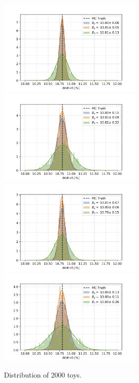 \begin{figure}[ht]
    \centering
    \includegraphics[width=7cm]{chapters/Analysis/sectionStatisticalAnalysis/figures/test_mu1b.png}
    \includegraphics[width=7cm]{chapters/Analysis/sectionStatisticalAnalysis/figures/test_mu2b.png}
    \includegraphics[width=7cm]{chapters/Analysis/sectionStatisticalAnalysis/figures/test_e1b.png}
    \includegraphics[width=7cm]{chapters/Analysis/sectionStatisticalAnalysis/figures/test_e2b.png}
    
    \caption{ Distribution of 2000 toys. }
    \label{test_toy}
\end{figure}

